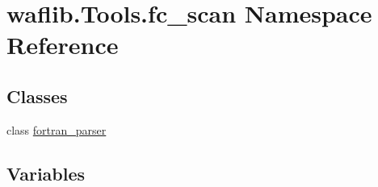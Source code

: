 \hypertarget{namespacewaflib_1_1_tools_1_1fc__scan}{}\section{waflib.\+Tools.\+fc\+\_\+scan Namespace Reference}
\label{namespacewaflib_1_1_tools_1_1fc__scan}
\subsection*{Classes}
\begin{DoxyCompactItemize}
\item 
class \hyperlink{classwaflib_1_1_tools_1_1fc__scan_1_1fortran__parser}{fortran\+\_\+parser}
\end{DoxyCompactItemize}
\subsection*{Variables}
